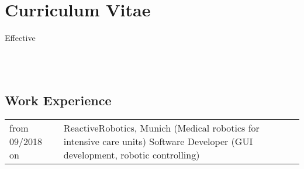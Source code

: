 \documentclass[a4paper,10pt]{memoir}
\begin{document}
\section*{\color{MidnightBlue} Curriculum Vitae}

\begin{flushright}
  Effective \monthname \, \the\year
\end{flushright}


\\
\\

\vspace*{5mm}
\subsection*{Work Experience}
\vspace*{-\baselineskip}
\begin{longtable}{@{}p{} p{}}
  from 09/2018 on &
  ReactiveRobotics, Munich (Medical robotics for intensive care units) \newline
  Software Developer (GUI development, robotic controlling)
\end{longtable}
\end{document}

